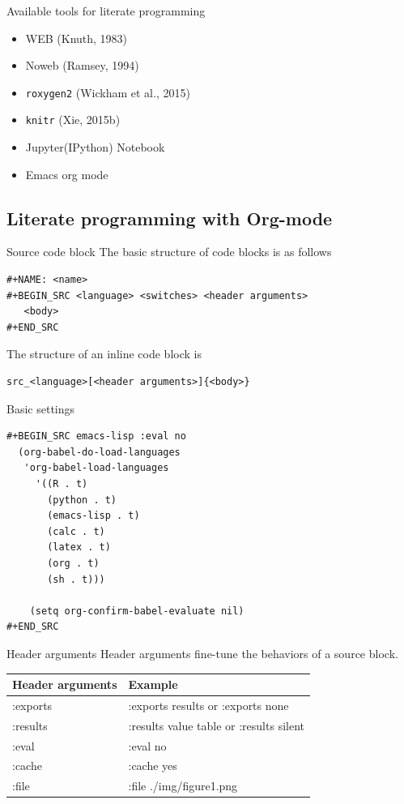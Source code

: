\documentclass[presentation]{beamer}
\begin{document}
\begin{frame}[fragile,label={sec:org9c51cd3}]{Available tools for literate programming}
 \begin{itemize}
\item WEB (Knuth, 1983)
\item Noweb (Ramsey, 1994)
\item \texttt{roxygen2} (Wickham et al., 2015)
\item \texttt{knitr} (Xie, 2015b)
\item Jupyter(IPython) Notebook
\item Emacs org mode
\end{itemize}
\end{frame}


\subsection{Literate programming with Org-mode}
\label{sec:orga2be94e}

\begin{frame}[fragile,label={sec:org72a4397}]{Source code block}
 The basic structure of code blocks is as follows

\begin{verbatim}
#+NAME: <name>
#+BEGIN_SRC <language> <switches> <header arguments>
   <body>
#+END_SRC
\end{verbatim}

The structure of an inline code block is

\begin{verbatim}
src_<language>[<header arguments>]{<body>}
\end{verbatim}
\end{frame}

\begin{frame}[fragile,label={sec:orgb0a0b07}]{Basic settings}
 \begin{verbatim}
#+BEGIN_SRC emacs-lisp :eval no
  (org-babel-do-load-languages
   'org-babel-load-languages
     '((R . t)
       (python . t)
       (emacs-lisp . t)
       (calc . t)
       (latex . t)
       (org . t)
       (sh . t)))

    (setq org-confirm-babel-evaluate nil)
#+END_SRC
\end{verbatim}
\end{frame}

\begin{frame}[label={sec:orgdfa475d}]{Header arguments}
Header arguments fine-tune the behaviors of a source block.

\begin{center}
\begin{tabular}{ll}
Header arguments & Example\\
\hline
:exports & :exports results or :exports none\\
:results & :results value table or :results silent\\
:eval & :eval no\\
:cache & :cache yes\\
:file & :file ./img/figure1.png\\
\end{tabular}
\end{center}
\end{frame}
\end{document}
